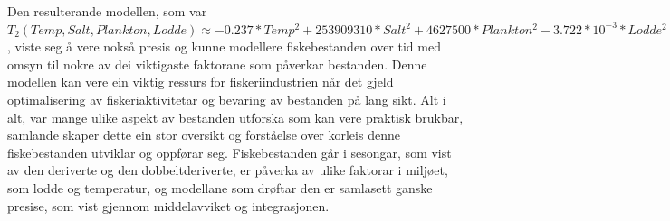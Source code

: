 \documentclass{report}
\begin{document}
Den resulterande modellen, som var $T_{2}(Temp,Salt,Plankton,Lodde) \approx -0.237*Temp^2 + 253909310*Salt^2 + 4627500*Plankton^2 -3.722*10^{-3}*Lodde^2 + 531481$, viste seg å vere nokså presis og kunne modellere fiskebestanden over tid med omsyn til nokre av dei viktigaste faktorane som påverkar bestanden.
Denne modellen kan vere ein viktig ressurs for fiskeriindustrien når det gjeld optimalisering av fiskeriaktivitetar og bevaring av bestanden på lang sikt.
Alt i alt, var mange ulike aspekt av bestanden utforska som kan vere praktisk brukbar, samlande skaper dette ein stor oversikt og forståelse over korleis denne fiskebestanden utviklar og oppførar seg. 
Fiskebestanden går i sesongar, som vist av den deriverte og den dobbeltderiverte, er påverka av ulike faktorar i miljøet, som lodde og temperatur, og modellane som drøftar den er samlasett ganske presise, som vist gjennom middelavviket og integrasjonen. 
\end{document}
